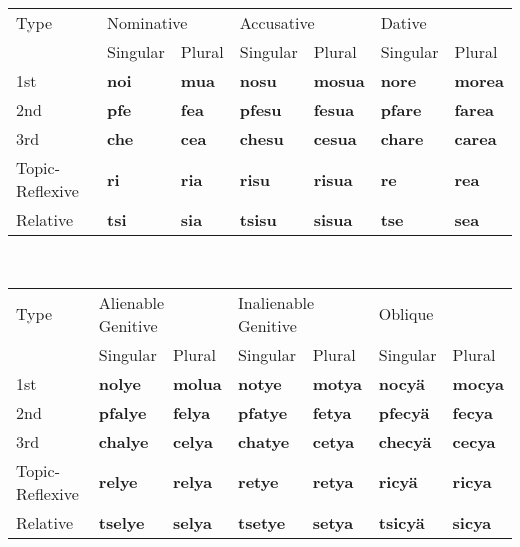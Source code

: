 \documentclass{article}
\begin{document}
\begin{table}[h]
\begin{tabular}{l | l l | l l | l l}
Type & \multicolumn{2}{|l|}{Nominative} & \multicolumn{2}{|l|}{Accusative} & \multicolumn{2}{|l}{Dative} \\
& Singular & Plural & Singular & Plural & Singular & Plural \\
\hline
1st & \textbf{noi} & \textbf{mua} & \textbf{nosu} & \textbf{mosua} & \textbf{nore} & \textbf{morea} \\
2nd & \textbf{pfe} & \textbf{fea} & \textbf{pfesu} & \textbf{fesua} & \textbf{pfare} & \textbf{farea} \\
3rd & \textbf{che} & \textbf{cea} & \textbf{chesu} & \textbf{cesua} & \textbf{chare} & \textbf{carea} \\
Topic-Reflexive & \textbf{ri} & \textbf{ria} & \textbf{risu} & \textbf{risua} & \textbf{re} & \textbf{rea} \\
Relative & \textbf{tsi} & \textbf{sia} & \textbf{tsisu} & \textbf{sisua} & \textbf{tse} & \textbf{sea} \\
\end{tabular} \\[0.5cm]

\begin{tabular}{l | l l | l l | l l}
Type & \multicolumn{2}{|l|}{Alienable Genitive} & \multicolumn{2}{|l|}{Inalienable Genitive} & \multicolumn{2}{|l}{Oblique} \\
& Singular & Plural & Singular & Plural & Singular & Plural \\
\hline
1st & \textbf{nolye} & \textbf{molua} & \textbf{notye} & \textbf{motya} & \textbf{nocy\"a} & \textbf{mocya} \\
2nd & \textbf{pfalye} & \textbf{felya} & \textbf{pfatye} & \textbf{fetya} & \textbf{pfecy\"a} & \textbf{fecya} \\
3rd & \textbf{chalye} & \textbf{celya} & \textbf{chatye} & \textbf{cetya} & \textbf{checy\"a} & \textbf{cecya} \\
Topic-Reflexive & \textbf{relye} & \textbf{relya} & \textbf{retye} & \textbf{retya} & \textbf{ricy\"a} & \textbf{ricya} \\
Relative & \textbf{tselye} & \textbf{selya} & \textbf{tsetye} & \textbf{setya} & \textbf{tsicy\"a} & \textbf{sicya} \\
\end{tabular} \\[0.5cm]


\end{table}
\end{document}
